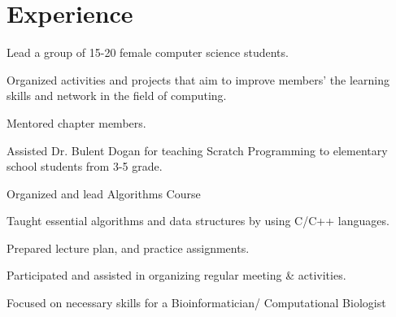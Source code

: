 \documentclass[]{deedy-resume-openfont}
\begin{document}
\hfill
\begin{minipage}[t]{0.66\textwidth} 
\iftrue

\section{Experience}

\vspace{\topsep} %
\begin{tightemize}
\item Lead a group of 15-20 female computer science students.
\item Organized activities and projects that aim to improve members' the learning skills and network in the field of computing.
\item Mentored chapter members.
\end{tightemize}
\sectionsep

\begin{tightemize}
\item Assisted Dr. Bulent Dogan for teaching Scratch Programming to elementary school students from 3-5 grade.
\end{tightemize}
\sectionsep

\begin{tightemize}
\item Organized and lead Algorithms Course
\item Taught essential algorithms and data structures by using C/C++ languages.
\item Prepared lecture plan, and practice assignments.
\end{tightemize}
\sectionsep

\begin{tightemize}
\item Participated and assisted in organizing regular meeting \& activities.
\item Focused on necessary skills for a Bioinformatician/ Computational Biologist
\end{tightemize}
\sectionsep


\end{minipage}
\end{document}
